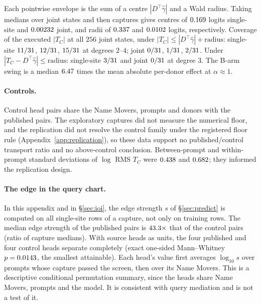 Each pointwise envelope is the sum of a centre $|D^\top\hat\gamma|$ and a Wald radius. Taking medians over
joint states and then captures gives centres of $0.169$ logits single-site and $0.00232$ joint,
and radii of $0.337$ and $0.0102$ logits, respectively. Coverage of the executed $|T_C|$
at all $256$ joint states, under $|T_C|\le|D^\top\hat\gamma|+\text{radius}$: single-site $11/31$,
$12/31$, $15/31$ at degrees $2$--$4$; joint $0/31$, $1/31$,
$2/31$. Under $|T_C-D^\top\hat\gamma|\le\text{radius}$: single-site $3/31$ and joint
$0/31$ at degree $3$. The B-arm swing is a median $6.47$ times the mean absolute per-donor
effect at $\alpha\approx1$.

\paragraph{Controls.} Control head pairs share the Name Movers, prompts and donors with the published pairs. The
exploratory captures did not measure the numerical floor, and the replication did not resolve the control family
under the registered floor rule (Appendix~\ref{app:replication}), so these data support no published/control
transport ratio and no above-control conclusion. Between-prompt and within-prompt standard deviations of $\log$ RMS
$T_C$ were $0.438$ and $0.682$; they informed the replication design.

\paragraph{The edge in the query chart.} In this appendix and in \S\ref{sec:ioi}, the edge strength $s$ of \S\ref{sec:predict} is computed on all single-site rows of a capture, not only on training rows. The median edge
strength of the published pairs is $43.3\times$ that of the control pairs (ratio of capture medians). With source heads as units, the four published and four control heads separate completely
(exact one-sided Mann--Whitney $p=0.0143$, the smallest attainable). Each head's value first averages
$\log_{10}s$ over prompts whose capture passed the screen, then over its Name Movers. This is a descriptive
conditional permutation summary, since the heads share Name Movers, prompts and the model. It is
consistent with query mediation and is not a test of it.


